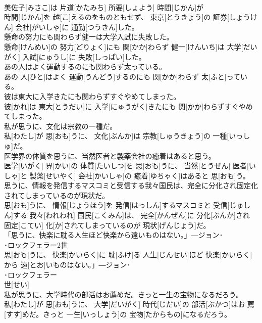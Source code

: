 \documentclass[8pt]{extreport}
\begin{document}
\begin{CJK}{UTF8}{min}
\\	美佐子[みさこ]は 片道[かたみち] 所要[しょよう] 時間[じかん]が 
\\	時間[じかん]を 越[こ]えるのをものともせず、 東京[とうきょう]の 証券[しょうけん] 会社[がいしゃ]に 通勤[つうきん]した。
\\	懸命の努力にも関わらず健一は大学入試に失敗した。	
\\	懸命[けんめい]の 努力[どりょく]にも 関[かか]わらず 健一[けんいち]は 大学[だいがく] 入試[にゅうし]に 失敗[しっぱい]した。
\\	あの人はよく運動するのにも関わらず太っている。	
\\	あの 人[ひと]はよく 運動[うんどう]するのにも 関[かか]わらず 太[ふと]っている。
\\	彼は東大に入学きたにも関わらずすぐやめてしまった。	
\\	彼[かれ]は 東大[とうだい]に 入学[にゅうがく]きたにも 関[かか]わらずすぐやめてしまった。
\\	私が思うに、文化は宗教の一種だ。	
\\	私[わたし]が 思[おも]うに、 文化[ぶんか]は 宗教[しゅうきょう]の 一種[いっしゅ]だ。
\\	医学界の体質を思うに、当然医者と製薬会社の癒着はあると思う。	
\\	医学[いがく] 界[かい]の 体質[たいしつ]を 思[おも]うに、 当然[とうぜん] 医者[いしゃ]と 製薬[せいやく] 会社[かいしゃ]の 癒着[ゆちゃく]はあると 思[おも]う。
\\	思うに、情報を発信するマスコミと受信する我々国民は、完全に分化され固定化されてしまっているのが現状だ。	
\\	思[おも]うに、 情報[じょうほう]を 発信[はっしん]するマスコミと 受信[じゅしん]する 我々[われわれ] 国民[こくみん]は、 完全[かんぜん]に 分化[ぶんか]され 固定[こてい] 化[か]されてしまっているのが 現状[げんじょう]だ。
\\	「思うに、快楽に耽る人生ほど快楽から遠いものはない。」―ジョン･
\\	･ロックフェラー2世	
\\	思[おも]うに、 快楽[かいらく]に 耽[ふけ]る 人生[じんせい]ほど 快楽[かいらく]から 遠[とお]いものはない。」―ジョン･ 
\\	･ロックフェラー 
\\	世[せい]
\\	私が思うに、大学時代の部活はお薦めだ。きっと一生の宝物になるだろう。	
\\	私[わたし]が 思[おも]うに、 大学[だいがく] 時代[じだい]の 部活[ぶかつ]はお 薦[すす]めだ。きっと 一生[いっしょう]の 宝物[たからもの]になるだろう。

\end{CJK}
\end{document}
